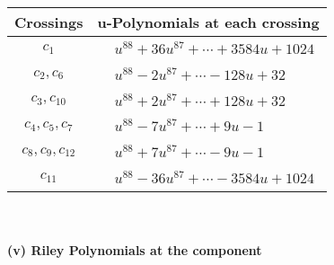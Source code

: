 \documentclass[1p]{elsarticle_modified}
\theoremstyle{definition}
\begin{document}
\begin{tabular}{m{50pt}|m{274pt}}
Crossings & \hspace{64pt}u-Polynomials at each crossing \\
\hline $$\begin{aligned}c_{1}\end{aligned}$$&$\begin{aligned}
&u^{88}+36 u^{87}+\cdots+3584 u+1024
\end{aligned}$\\
\hline $$\begin{aligned}c_{2},c_{6}\end{aligned}$$&$\begin{aligned}
&u^{88}-2 u^{87}+\cdots-128 u+32
\end{aligned}$\\
\hline $$\begin{aligned}c_{3},c_{10}\end{aligned}$$&$\begin{aligned}
&u^{88}+2 u^{87}+\cdots+128 u+32
\end{aligned}$\\
\hline $$\begin{aligned}c_{4},c_{5},c_{7}\end{aligned}$$&$\begin{aligned}
&u^{88}-7 u^{87}+\cdots+9 u-1
\end{aligned}$\\
\hline $$\begin{aligned}c_{8},c_{9},c_{12}\end{aligned}$$&$\begin{aligned}
&u^{88}+7 u^{87}+\cdots-9 u-1
\end{aligned}$\\
\hline $$\begin{aligned}c_{11}\end{aligned}$$&$\begin{aligned}
&u^{88}-36 u^{87}+\cdots-3584 u+1024
\end{aligned}$\\
\hline
\end{tabular}\\~\\
\newpage\renewcommand{\arraystretch}{1}
\flushleft \textbf{(v) Riley Polynomials at the component}\newline \\
\end{document}
